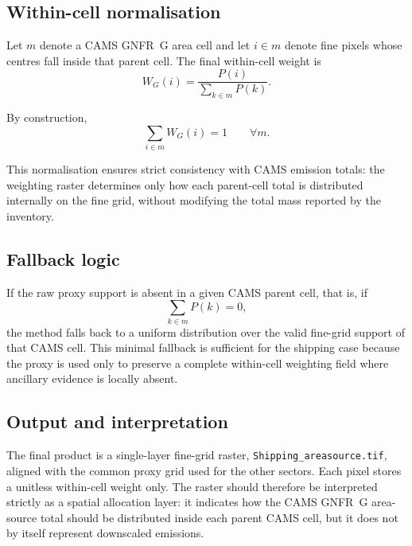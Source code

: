 \subsection{Within-cell normalisation}

Let $m$ denote a CAMS GNFR~G area cell and let $i \in m$ denote fine
pixels whose centres fall inside that parent cell. The final within-cell
weight is
\begin{equation}
  W_G(i) =
  \frac{P(i)}
       {\displaystyle\sum_{k \in m} P(k)}.
\end{equation}

By construction,
\begin{equation}
  \sum_{i \in m} W_G(i) = 1
  \qquad \forall m.
\end{equation}

This normalisation ensures strict consistency with CAMS emission totals:
the weighting raster determines only how each parent-cell total is
distributed internally on the fine grid, without modifying the total mass
reported by the inventory.

\subsection{Fallback logic}

If the raw proxy support is absent in a given CAMS parent cell, that is,
if
\begin{equation}
  \sum_{k \in m} P(k) = 0,
\end{equation}
the method falls back to a uniform distribution over the valid fine-grid
support of that CAMS cell. This minimal fallback is sufficient for the
shipping case because the proxy is used only to preserve a complete
within-cell weighting field where ancillary evidence is locally absent.

\subsection{Output and interpretation}

The final product is a single-layer fine-grid raster,
\texttt{Shipping\_areasource.tif}, aligned with the common proxy grid used
for the other sectors. Each pixel stores a unitless within-cell weight
only. The raster should therefore be interpreted strictly as a spatial
allocation layer: it indicates how the CAMS GNFR~G area-source total
should be distributed inside each parent CAMS cell, but it does not by
itself represent downscaled emissions.
